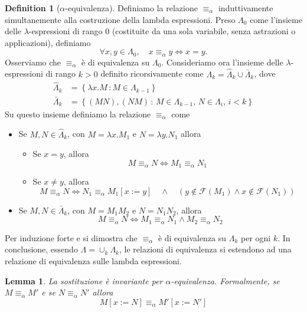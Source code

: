 \documentclass[a4paper,11pt]{article}
\newtheorem{lemma}{Lemma}
\theoremstyle{definition}
\newtheorem{defn}{Definition}
\newcommand{\FF}{\mathcal{F}}
\begin{document}
\begin{defn}[$\alpha$-equivalenza]
  Definiamo la relazione $\equiv_\alpha$ induttivamente simultanemente alla costruzione
  della lambda espressioni.
  Preso $\Lambda_0$ come l'insieme delle $\lambda$-espressioni di rango $0$
  (costituite da una sola variabile, senza astrazioni o applicazioni), definiamo
  \[
    \forall x,y \in \Lambda_0,\quad x\equiv_\alpha y\iff x=y.
  \]
  Osserviamo che $\equiv_\alpha$ è di equivalenza su $\Lambda_0$.
  Consideriamo ora l'insieme delle $\lambda$-espressioni di rango $k>0$
  definito ricorsivamente come $\Lambda_k=\hat \Lambda_k\cup \bar \Lambda_k$,
  dove
  \[
    \begin{aligned}
      \hat \Lambda_k &=\left\{ \lambda
      x.M\,:M\in\Lambda_{k-1}\right\}\\
      \bar \Lambda_k&=\left\{ (MN), (NM)\,:\, M\in\Lambda_{k-1},\,N\in\Lambda_i,\,i<k \right\}
    \end{aligned}
  \]
  Su questo insieme definiamo la relazione $\equiv_\alpha$ come
  \begin{itemize}
    \item Se $M,N\in\hat\Lambda_{k}$, con $M=\lambda x.M_1$ e $N=\lambda y.N_1$
      allora
      \begin{itemize}
        \item Se $x=y$, allora
          \[
            M\equiv_\alpha N \iff M_1\equiv_\alpha N_1
          \]
        \item Se $x\ne y$, allora
          \[
            M\equiv_\alpha N \iff N_1\equiv_\alpha M_1[x:=y]\quad\wedge\quad
            (y\not\in\FF(M_1) \wedge x\not\in\FF(N_1))
          \]
      \end{itemize}
    \item Se $M,N\in\bar\Lambda_k$, con $M=M_1M_2$ e $N=N_1N_2$, allora
      \[
        M\equiv_\alpha N \iff M_1\equiv_\alpha N_1\wedge M_2\equiv_\alpha N_2
      \]
  \end{itemize}
  Per induzione forte e  si dimostra che $\equiv_\alpha$ è di equivalenza
  su $\Lambda_k$ per ogni $k$. In conclusione, essendo $\Lambda=\cup_k \Lambda_k$, 
  le relazioni di equivalenza si estendono ad una relazione di equivalenza 
  sulle lambda espressioni.
\end{defn}



\begin{lemma}
  La sostituzione è invariante per $\alpha$-equivalenza. Formalmente, se
  $M\equiv_\alpha M'$ e se $N\equiv_\alpha N'$ allora
  \[
    M[x:= N] \equiv_\alpha M'[x:=N']
  \]
\end{lemma}
\end{document}
